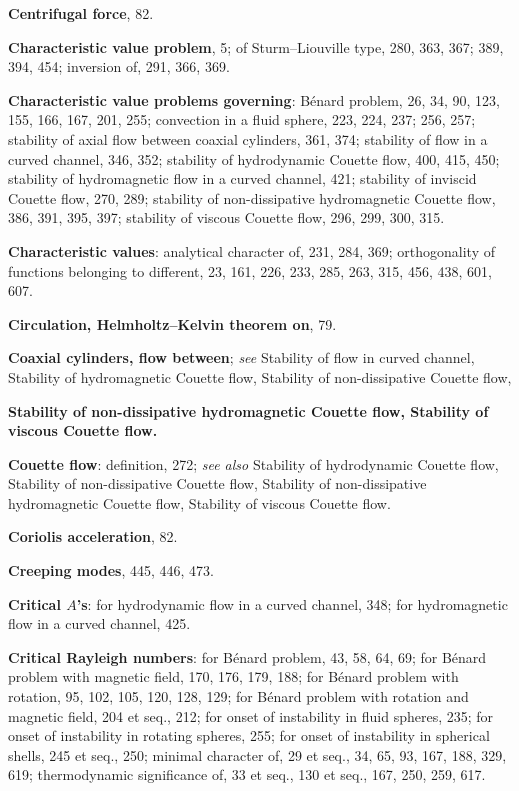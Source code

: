\begin{small}
\medskip\noindent
\textbf{Centrifugal force}, 82.

\medskip\noindent
\textbf{Characteristic value problem}, 5;
  of Sturm--Liouville type, 280, 363, 367;
    389, 394, 454;
  inversion of, 291, 366, 369.

\medskip\noindent
\textbf{Characteristic value problems governing}:
  B\'enard problem, 26, 34, 90, 123, 155,
    166, 167, 201, 255;
  convection in a fluid sphere, 223, 224, 237;
    256, 257;
  stability of axial flow between coaxial
    cylinders, 361, 374;
  stability of flow in a curved channel, 346,
    352;
  stability of hydrodynamic Couette flow,
    400, 415, 450;
  stability of hydromagnetic flow in a
    curved channel, 421;
  stability of inviscid Couette flow, 270,
    289;
  stability of non-dissipative hydromagnetic Couette flow, 386, 391, 395, 397;
  stability of viscous Couette flow, 296,
    299, 300, 315.

\medskip\noindent
\textbf{Characteristic values}:
  analytical character of, 231, 284, 369;
  orthogonality of functions belonging to
    different, 23, 161, 226, 233, 285, 263,
    315, 456, 438, 601, 607.

\medskip\noindent
\textbf{Circulation, Helmholtz--Kelvin theorem
  on}, 79.

\medskip\noindent
\textbf{Coaxial cylinders, flow between}; \textit{see} Stability of flow in curved channel, Stability
of hydromagnetic Couette flow, Stability of non-dissipative Couette flow,

\medskip\noindent
\textbf{Stability of non-dissipative hydromagnetic Couette flow, Stability of
  viscous Couette flow.}

\medskip\noindent
\textbf{Couette flow}:
  definition, 272;
  \textit{see also} Stability of hydrodynamic
    Couette flow, Stability of non-dissipative Couette flow, Stability of non-dissipative hydromagnetic Couette
    flow, Stability of viscous Couette flow.

\medskip\noindent
\textbf{Coriolis acceleration}, 82.

\medskip\noindent
\textbf{Creeping modes}, 445, 446, 473.

\medskip\noindent
\textbf{Critical $A$'s}:
  for hydrodynamic flow in a curved
    channel, 348;
  for hydromagnetic flow in a curved
    channel, 425.

\medskip\noindent
\textbf{Critical Rayleigh numbers}:
  for B\'enard problem, 43, 58, 64, 69;
  for B\'enard problem with magnetic field,
    170, 176, 179, 188;
  for B\'enard problem with rotation, 95,
    102, 105, 120, 128, 129;
  for B\'enard problem with rotation and
    magnetic field, 204 et seq., 212;
  for onset of instability in fluid spheres,
    235;
  for onset of instability in rotating spheres,
    255;
  for onset of instability in spherical shells,
    245 et seq., 250;
  minimal character of, 29 et seq., 34, 65,
    93, 167, 188, 329, 619;
  thermodynamic significance of, 33 et
    seq., 130 et seq., 167, 250, 259, 617.


\end{small}
